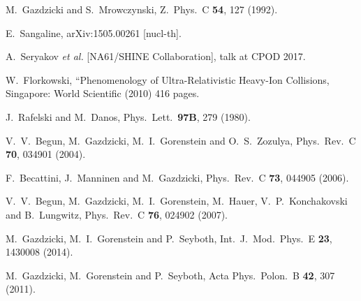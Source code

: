 \documentclass{PoS}
\begin{document}
\begin{thebibliography}{99}
M.~Gazdzicki and S.~Mrowczynski,
Z.\ Phys.\ C {\bf 54}, 127 (1992).

E.~Sangaline,
arXiv:1505.00261 [nucl-th].

A.~Seryakov \textit{et al.} [NA61/SHINE Collaboration],
talk at CPOD 2017.



W.~Florkowski,
``Phenomenology of Ultra-Relativistic Heavy-Ion Collisions,
Singapore: World Scientific (2010) 416 pages.

J.~Rafelski and M.~Danos,
Phys.\ Lett.\  {\bf 97B}, 279 (1980).


V.~V.~Begun, M.~Gazdzicki, M.~I.~Gorenstein and O.~S.~Zozulya,
Phys.\ Rev.\ C {\bf 70}, 034901 (2004).


F.~Becattini, J.~Manninen and M.~Gazdzicki,
Phys.\ Rev.\ C {\bf 73}, 044905 (2006).


V.~V.~Begun, M.~Gazdzicki, M.~I.~Gorenstein, M.~Hauer, V.~P.~Konchakovski and B.~Lungwitz,
Phys.\ Rev.\ C {\bf 76}, 024902 (2007).

M.~Gazdzicki, M.~I.~Gorenstein and P.~Seyboth,
Int.\ J.\ Mod.\ Phys.\ E {\bf 23}, 1430008 (2014).

M.~Gazdzicki, M.~Gorenstein and P.~Seyboth,
Acta Phys.\ Polon.\ B {\bf 42}, 307 (2011).



\end{thebibliography}
\end{document}
